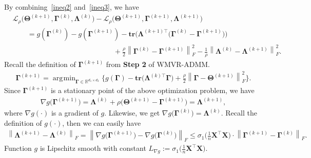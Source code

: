 \documentclass[alpha-refs]{wiley-article}
\DeclareMathOperator*{\argmin}{\arg\!\min}
\begin{document}
By combining~\eqref{ineq2} and~\eqref{ineq3}, we have
\begin{align} \label{ineq4}
    &\mathcal{L}_{\rho} \big( \boldsymbol{\Theta}^{(k+1)},\boldsymbol{\Gamma}^{(k)},\boldsymbol{\Lambda}^{(k)} \big) 
    - \mathcal{L}_{\rho} \big( \boldsymbol{\Theta}^{(k+1)},\boldsymbol{\Gamma}^{(k+1)},\boldsymbol{\Lambda}^{(k+1)} \big) \nonumber \\
    &\qquad = g(\boldsymbol{\Gamma}^{(k)})-g(\boldsymbol{\Gamma}^{(k+1)}) - \textbf{tr}\big( \boldsymbol{\Lambda}^{(k+1)\top}\big(\boldsymbol{\Gamma}^{(k)}-\boldsymbol{\Gamma}^{(k+1)}\big)\big) \nonumber \\
    &\qquad \qquad \qquad \qquad \qquad \qquad \qquad
    + \frac{\rho}{2}\left\| \boldsymbol{\Gamma}^{(k)}-\boldsymbol{\Gamma}^{(k+1)} \right\|_{F}^{2} -\frac{1}{\rho}\left\| \boldsymbol{\Lambda}^{(k)}-\boldsymbol{\Lambda}^{(k+1)} \right\|_{F}^{2}.
\end{align}
Recall the definition of $\boldsymbol{\Gamma}^{(k+1)}$ from \textbf{Step 2} of WMVR-ADMM.
\begin{align*}
    \boldsymbol{\Gamma}^{(k+1)} = \argmin_{\boldsymbol{\Gamma} \in \mathbb{R}^{d_{1} \times d_{2}}}
    \bigg\{ g(\boldsymbol{\Gamma}) - \textbf{tr}\big(\boldsymbol{\Lambda}^{(k)\top}\boldsymbol{\Gamma}\big)+\frac{\rho}{2}\left\|\boldsymbol{\Gamma}-\boldsymbol{\Theta}^{(k+1)} \right\|_{F}^{2} \bigg\}.
\end{align*}
Since $\boldsymbol{\Gamma}^{(k+1)}$ is a stationary point of the above optimization problem, we have
\begin{align*}
    \nabla g\big( \boldsymbol{\Gamma}^{(k+1)} \big)
    = \boldsymbol{\Lambda}^{(k)} + \rho\big( \boldsymbol{\Theta}^{(k+1)}-\boldsymbol{\Gamma}^{(k+1)} \big)
    = \boldsymbol{\Lambda}^{(k+1)},
\end{align*}
where $\nabla g (\cdot)$ is a gradient of $g$.
Likewise, we get $\nabla g\big( \boldsymbol{\Gamma}^{(k)} \big) = \boldsymbol{\Lambda}^{(k)}$.
Recall the definition of $g(\cdot)$, then we can easily have
\begin{align} \label{ineq5}
    \left\|\boldsymbol{\Lambda}^{(k+1)}-\boldsymbol{\Lambda}^{(k)}\right\|_{F} =
    \left\|\nabla g\big( \boldsymbol{\Gamma}^{(k+1)} \big)
    - \nabla g\big( \boldsymbol{\Gamma}^{(k)} \big)\right\|_{F}
    \leq \sigma_{1}\bigg( \frac{1}{n}\boldsymbol{X}^{\top}\boldsymbol{X}\bigg)
    \cdot 
    \left\| \boldsymbol{\Gamma}^{(k+1)} - \boldsymbol{\Gamma}^{(k)} \right\|_{F}.
\end{align}
Function $g$ is Lipschitz smooth with constant $L_{\nabla g}:=\sigma_{1}\bigg( \frac{1}{n}\boldsymbol{X}^{\top}\boldsymbol{X}\bigg)$.
\end{document}
